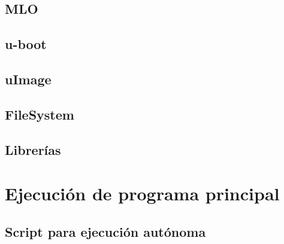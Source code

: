 \subsection{MLO}
\subsection{u-boot}
\subsection{uImage}
\subsection{FileSystem}
\subsection{Librerías}
\section{Ejecución de programa principal}
\subsection{Script para ejecución autónoma}

